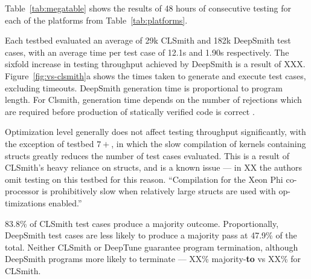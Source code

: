 Table~\ref{tab:megatable} shows the results of 48 hours of consecutive testing for each of the platforms from Table~\ref{tab:platforms}.

Each testbed evaluated an average of 29k CLSmith and 182k DeepSmith test cases, with an average time per test case of 12.1s and 1.90s respectively. The sixfold increase in testing throughput achieved by DeepSmith is a result of XXX. Figure~\ref{fig:vs-clsmith}a shows the times taken to generate and execute test cases, excluding timeouts. DeepSmith generation time is proportional to program length. For Clsmith, generation time depends on the number of rejections which are required before production of statically verified code is correct \cc{\ldots}.

Optimization level generally does not affect testing throughput significantly, with the exception of testbed $7+$, in which the slow compilation of kernels containing structs greatly reduces the number of test cases evaluated. This is a result of CLSmith's heavy reliance on structs, and is a known issue --- in XX the authors omit testing on this testbed for this reason. ``Compilation for the Xeon Phi co-processor is prohibitively slow when relatively large structs are used with op- timizations enabled.''

83.8\% of CLSmith test cases produce a majority \textbf{\cmark} outcome. Proportionally, DeepSmith test cases are less likely to produce a majority pass at 47.9\% of the total.  Neither CLSmith or DeepTune guarantee program termination, although DeepSmith programs more likely to terminate --- XX\% majority-\textbf{to} vs XX\% for CLSmith.


